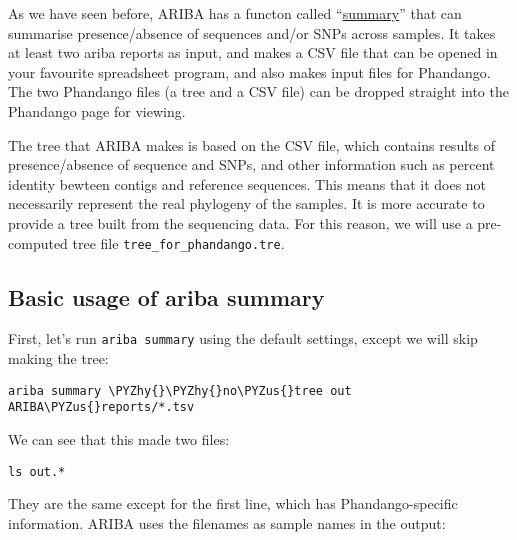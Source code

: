 \documentclass[11pt]{article}
\makeatletter
\def\PYZus{\char`\_}
\def\PYZhy{\char`\-}
\newcommand{\boxspacing}{\kern\kvtcb@left@rule\kern\kvtcb@boxsep}
\newcommand{\prompt}[4]{
         {\ttfamily\llap{{\color{blue}\LARGE\faKeyboardO\hspace{3pt}#4}}\vspace{-\baselineskip}}
    }
\makeatother
\begin{document}
    As we have seen before, ARIBA has a functon called
``\href{https://github.com/sanger-pathogens/ariba/wiki/Task:-summary}{summary}''
that can summarise presence/absence of sequences and/or SNPs across
samples. It takes at least two ariba reports as input, and makes a CSV
file that can be opened in your favourite spreadsheet program, and also
makes input files for Phandango. The two Phandango files (a tree and a
CSV file) can be dropped straight into the Phandango page for viewing.

The tree that ARIBA makes is based on the CSV file, which contains
results of presence/absence of sequence and SNPs, and other information
such as percent identity bewteen contigs and reference sequences. This
means that it does not necessarily represent the real phylogeny of the
samples. It is more accurate to provide a tree built from the sequencing
data. For this reason, we will use a pre-computed tree file
\texttt{tree\_for\_phandango.tre}.

\hypertarget{basic-usage-of-ariba-summary}{%
\subsection{Basic usage of ariba
summary}\label{basic-usage-of-ariba-summary}}

First, let's run \texttt{ariba\ summary} using the default settings,
except we will skip making the tree:

    \begin{tcolorbox}[breakable, size=fbox, boxrule=1pt, pad at break*=1mm,colback=cellbackground, colframe=cellborder]
\prompt{In}{incolor}{ }{\boxspacing}
\begin{Verbatim}[commandchars=\\\{\}]
ariba summary \PYZhy{}\PYZhy{}no\PYZus{}tree out ARIBA\PYZus{}reports/*.tsv
\end{Verbatim}
\end{tcolorbox}

    We can see that this made two files:

    \begin{tcolorbox}[breakable, size=fbox, boxrule=1pt, pad at break*=1mm,colback=cellbackground, colframe=cellborder]
\prompt{In}{incolor}{ }{\boxspacing}
\begin{Verbatim}[commandchars=\\\{\}]
ls out.*
\end{Verbatim}
\end{tcolorbox}

    They are the same except for the first line, which has
Phandango-specific information. ARIBA uses the filenames as sample names
in the output:
\end{document}

